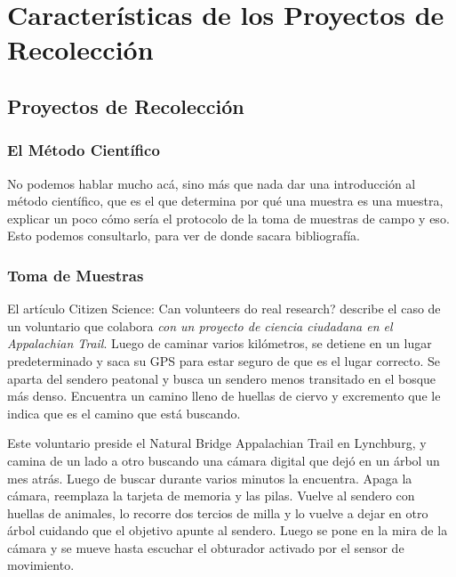 \chapter{Características de los Proyectos de Recolección}

\section{Proyectos de Recolección}

	

\subsection{El Método Científico}
No podemos hablar mucho acá, sino más que nada dar una introducción al método científico, que es el que determina por qué una muestra es una muestra, explicar un poco cómo sería el protocolo de la toma de muestras de campo y eso. Esto podemos consultarlo, para ver de donde sacara bibliografía.

\subsection{Toma de Muestras}

	El artículo Citizen Science: Can volunteers do real research? describe el caso de un voluntario que colabora \textit{con un proyecto de ciencia ciudadana en el Appalachian Trail}. Luego de caminar varios kilómetros, se detiene en un lugar predeterminado y saca su GPS para estar seguro de que es el lugar correcto. Se aparta del sendero peatonal y busca un sendero menos transitado en el bosque más denso. Encuentra un camino lleno de huellas de ciervo y excremento que le indica que es el camino que está buscando.
	
	Este voluntario preside el Natural Bridge Appalachian Trail en Lynchburg, y camina de un lado a otro buscando una cámara digital que dejó en un árbol un mes atrás. Luego de buscar durante varios minutos la encuentra. Apaga la cámara, reemplaza la tarjeta de memoria y las pilas. Vuelve al sendero con huellas de animales, lo recorre dos tercios de milla y lo vuelve a dejar en otro árbol cuidando que el objetivo apunte al sendero. Luego se pone en la mira de la cámara y se mueve hasta escuchar el obturador activado por el sensor de movimiento. 
	
